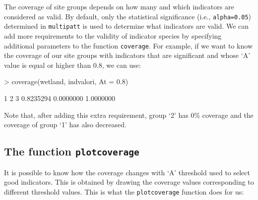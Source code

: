 \documentclass[11pt,a4paper]{article}
\begin{document}
The coverage of site groups depends on how many and which indicators are considered as valid. By default, only the statistical significance (i.e., \texttt{alpha=0.05}) determined in \texttt{multipatt} is used to determine what indicators are valid. We can add more requirements to the validity of indicator species by specifying additional parameters to the function \texttt{coverage}. For example, if we want to know the coverage of our site groups with indicators that are significant and whose `A' value is equal or higher than 0.8, we can use:
\begin{Schunk}
\begin{Sinput}
> coverage(wetland, indvalori, At = 0.8)
\end{Sinput}
\begin{Soutput}
        1         2         3 
0.8235294 0.0000000 1.0000000 
\end{Soutput}
\end{Schunk}
Note that, after adding this extra requirement, group `2' has 0\% coverage and the coverage of group `1' has also decreased.

\subsection{The function \texttt{plotcoverage}}
It is  possible to know how the coverage changes with `A' threshold used to select good indicators. This is obtained by drawing the coverage values corresponding to different threshold values. This is what the \texttt{plotcoverage} function does for us:
\end{document}
